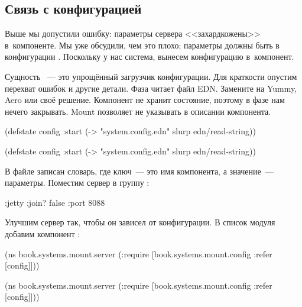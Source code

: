 \subsection{Связь с конфигурацией}

Выше мы допустили ошибку: параметры сервера <<захардкожены>> в~компоненте. Мы
уже обсудили, чем это плохо; параметры должны быть в
конфигурации . Поскольку у нас система, вынесем конфигурацию
в~компонент.


Сущность ~--- это упрощённый загрузчик конфигурации. Для краткости
опустим перехват ошибок и другие детали. Фаза  читает файл
EDN. Замените  на Yummy, Aero или своё
решение. Компонент не хранит состояние, поэтому в фазе  нам нечего
закрывать. Mount позволяет не указывать  в описании компонента.

\ifnarrow

\begin{clojure}
(defstate config
  :start
  (-> "system.config.edn"
      slurp
      edn/read-string))
\end{clojure}

\else

\begin{clojure}
(defstate config
  :start
  (-> "system.config.edn" slurp edn/read-string))
\end{clojure}

\fi

В файле  записан словарь, где ключ~--- это имя компонента, а
значение~--- параметры. Поместим сервер в группу :

\begin{clojure}
{:jetty {:join? false :port 8088}}
\end{clojure}


Улучшим сервер так, чтобы он зависел от конфигурации. В список 
модуля добавим компонент :

\ifnarrow

\begin{clojure}
(ns book.systems.mount.server
 (:require
  [book.systems.mount.config
   :refer [config]]))
\end{clojure}

\else

\begin{clojure}
(ns book.systems.mount.server
 (:require
  [book.systems.mount.config :refer [config]]))
\end{clojure}

